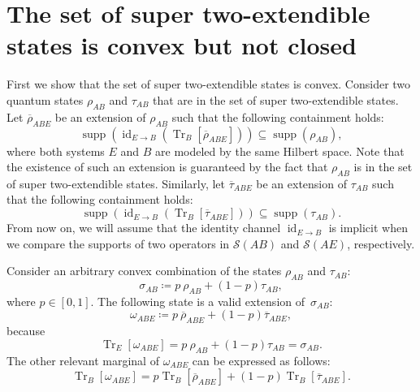 \documentclass[twocolumn,letterpaper, dvipsnames,allowtoday, accepted = 2025-12-31]{quantumarticle}
\begin{document}
\section{The set of super two-extendible states is convex but not closed}

\label{app:sup_2_ext_convex_open}

First we show that the set of super two-extendible states is convex. Consider two quantum states $\rho_{AB}$ and $\tau_{AB}$ that are in the set of super two-extendible states. Let $\overline{\rho}_{ABE}$ be an extension of $\rho_{AB}$ such that the following containment holds:
\begin{equation}\label{eq:rho_contained}
    \operatorname{supp}\!\left(\operatorname{id}_{E \to B}(\operatorname{Tr}_B\!\left[\overline{\rho}_{ABE}\right])\right) \subseteq \operatorname{supp}\!\left(\rho_{AB}\right),
\end{equation}
where both systems $E$ and $B$ are modeled by the same Hilbert space. Note that the existence of such an extension is guaranteed by the fact that $\rho_{AB}$ is in the set of super two-extendible states. Similarly, let $\overline{\tau}_{ABE}$ be an extension of $\tau_{AB}$ such that the following containment holds:
\begin{equation}\label{eq:tau_contained}
    \operatorname{supp}\!\left(\operatorname{id}_{E \to B}(\operatorname{Tr}_B\!\left[\overline{\tau}_{ABE}\right])\right) \subseteq \operatorname{supp}\!\left(\tau_{AB}\right).
\end{equation}
From now on, we will assume that the identity channel $\operatorname{id}_{E\to B}$ is implicit when we compare the supports of two operators in $\mathcal{S}(AB)$ and $\mathcal{S}(AE)$, respectively.

Consider an arbitrary convex combination of the states $\rho_{AB}$ and $\tau_{AB}$:
\begin{equation}
    \sigma_{AB} \coloneqq p~\rho_{AB} + (1-p)\tau_{AB},
\end{equation}
where $p \in [0,1]$.
The following state is a valid extension of~$\sigma_{AB}$:
\begin{equation}
    \omega_{ABE} \coloneqq p~\overline{\rho}_{ABE} + (1-p)\overline{\tau}_{ABE},
\end{equation}
because
\begin{equation}
    \operatorname{Tr}_E\!\left[\omega_{ABE}\right] = p~\rho_{AB} + (1-p)\tau_{AB} = \sigma_{AB}.
\end{equation}
The other relevant marginal of $\omega_{ABE}$ can be expressed as follows:
\begin{equation}
    \operatorname{Tr}_{B}\!\left[\omega_{ABE}\right] = p\operatorname{Tr}_{B}\!\left[\overline{\rho}_{ABE}\right] + (1-p)\operatorname{Tr}_{B}\!\left[\overline{\tau}_{ABE}\right].
\end{equation}
\end{document}
